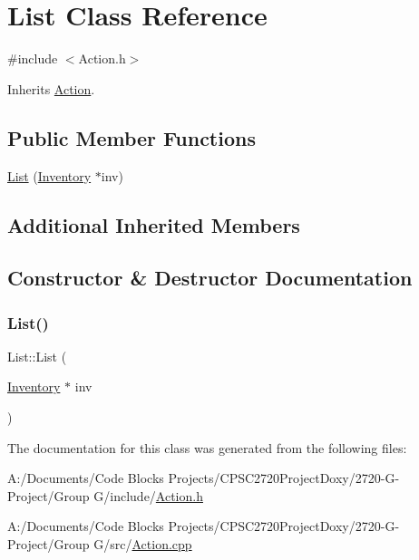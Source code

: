 \hypertarget{class_list}{}\section{List Class Reference}
\label{class_list}


{\ttfamily \#include $<$Action.\+h$>$}



Inherits \mbox{\hyperlink{class_action}{Action}}.

\subsection*{Public Member Functions}
\begin{DoxyCompactItemize}
\item 
\mbox{\hyperlink{class_list_a0bb4653b6cb4d15f74dbee296b75cdee}{List}} (\mbox{\hyperlink{class_inventory}{Inventory}} $\ast$inv)
\end{DoxyCompactItemize}
\subsection*{Additional Inherited Members}


\subsection{Constructor \& Destructor Documentation}
\mbox{\label{class_list_a0bb4653b6cb4d15f74dbee296b75cdee}} 
\subsubsection{\texorpdfstring{List()}{List()}}
{\footnotesize\ttfamily List\+::\+List (\begin{DoxyParamCaption}\item[{\mbox{\hyperlink{class_inventory}{Inventory}} $\ast$}]{inv }\end{DoxyParamCaption})}



The documentation for this class was generated from the following files\+:\begin{DoxyCompactItemize}
\item 
A\+:/\+Documents/\+Code Blocks Projects/\+C\+P\+S\+C2720\+Project\+Doxy/2720-\/\+G-\/\+Project/\+Group G/include/\mbox{\hyperlink{_action_8h}{Action.\+h}}\item 
A\+:/\+Documents/\+Code Blocks Projects/\+C\+P\+S\+C2720\+Project\+Doxy/2720-\/\+G-\/\+Project/\+Group G/src/\mbox{\hyperlink{_action_8cpp}{Action.\+cpp}}\end{DoxyCompactItemize}
